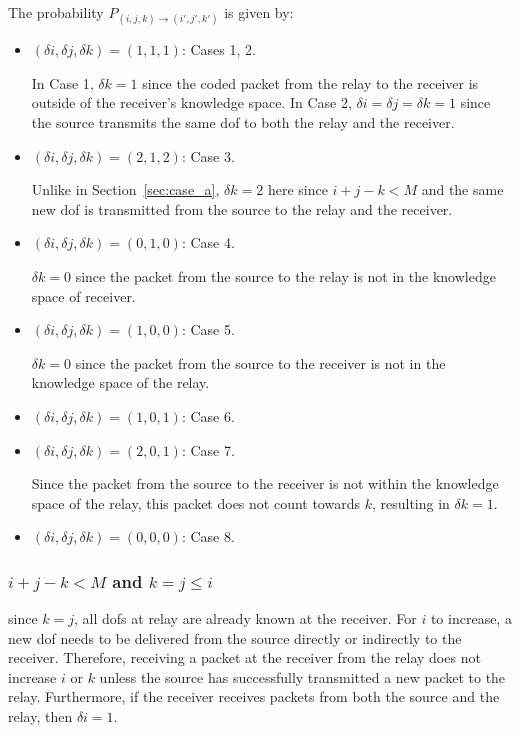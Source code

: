 The probability $P_{(i,j,k) \rightarrow (i',j',k')}$ is given by:
    \begin{itemize}
        \item $(\delta i,\delta j,\delta k)=(1,1,1)$: Cases 1, 2.

            In Case 1, $\delta k = 1$ since the coded packet from the relay to the receiver is outside of the receiver's knowledge space. In Case 2, $\delta i = \delta j =\delta k = 1$ since the source transmits the same dof to both the relay and the receiver. 

        \item $(\delta i,\delta j,\delta k)=(2,1,2)$: Case 3.
	
	    Unlike in Section~\ref{sec:case_a}, $\delta k=2$ here since $i+j-k <M$ and the same new dof is transmitted from the source to the relay and the receiver. 

        \item $(\delta i,\delta j,\delta k)=(0,1,0)$: Case 4.

            $\delta k = 0$ since the packet from the source to the relay is not in the knowledge space of receiver.

        \item $(\delta i,\delta j,\delta k)=(1,0,0)$: Case 5.

            $\delta k = 0$ since the packet from the source to the receiver is not in the knowledge space of the relay.

        \item $(\delta i,\delta j,\delta k)=(1,0,1)$: Case 6.
        \item $(\delta i,\delta j,\delta k)=(2,0,1)$: Case 7.

            Since the packet from the source to the receiver is not within the knowledge space of the relay, this packet does not count towards $k$, resulting in $\delta k = 1$. 
            
        \item $(\delta i,\delta j,\delta k)=(0,0,0)$: Case 8.
    \end{itemize}

\subsubsection{$i+j-k <M$ and $k=j\leq i$}
since $k = j$, all dofs at relay are already known at the receiver. For $i$ to increase, a new dof needs to be delivered from the source directly or indirectly to the receiver. Therefore, receiving a packet at the receiver from the relay does not increase $i$ or $k$ unless the source has successfully transmitted a new packet to the relay. Furthermore, if the receiver receives packets from both the source and the relay,  then $\delta i = 1$.

